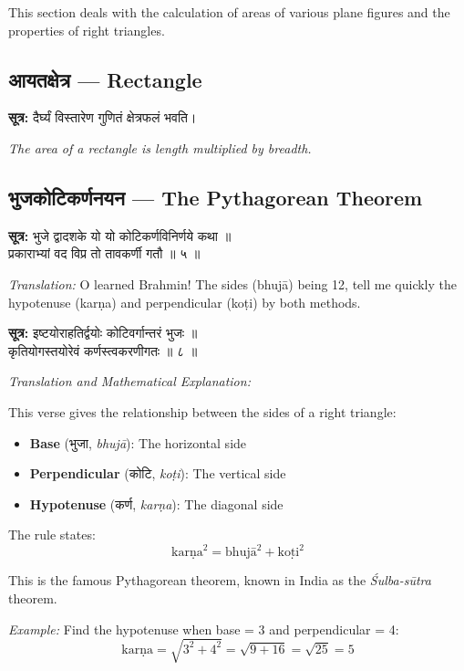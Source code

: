 \documentclass[10pt,a4paper]{article}
\newenvironment{sanskritverse}{%
  \begin{center}%
  \begin{minipage}{0.94\textwidth}%
  \centering\devanagarifont\small%
}{%
  \end{minipage}%
  \end{center}%
  \vspace{0.1em}%
}
\newcommand{\sutratxt}[2]{%
  \begin{center}%
  \colorbox{sanskritbg}{%
    \begin{minipage}{0.93\textwidth}%
    \centering\small\vspace{3pt}%
    {\devanagarifont\textbf{सूत्र:} #1}\par\vspace{2pt}%
    \textit{#2}\vspace{3pt}%
    \end{minipage}%
  }%
  \end{center}%
  \vspace{0.1em}%
}
\begin{document}
This section deals with the calculation of areas of various plane figures and the properties of right triangles.

\subsection{आयतक्षेत्र — Rectangle}

\sutratxt{दैर्घ्यं विस्तारेण गुणितं क्षेत्रफलं भवति।}{The area of a rectangle is length multiplied by breadth.}

\subsection{भुजकोटिकर्णनयन — The Pythagorean Theorem}

\begin{sanskritverse}
\textbf{सूत्र:} भुजे द्वादशके यो यो कोटिकर्णविनिर्णये कथा ॥\\
प्रकाराभ्यां वद विप्र तो तावकर्णी गतौ ॥ ५ ॥
\end{sanskritverse}
\textit{Translation:} O learned Brahmin! The sides (bhujā) being 12, tell me quickly the hypotenuse (karṇa) and perpendicular (koṭi) by both methods.

\begin{sanskritverse}
\textbf{सूत्र:} इष्टयोराहतिर्द्वयोः कोटिवर्गान्तरं भुजः ॥\\
कृतियोगस्तयोरेवं कर्णस्त्वकरणीगतः ॥ ८ ॥
\end{sanskritverse}
\textit{Translation and Mathematical Explanation:}

This verse gives the relationship between the sides of a right triangle:
\begin{itemize}[itemsep=0pt]
\item \textbf{Base} (भुजा, \textit{bhujā}): The horizontal side
\item \textbf{Perpendicular} (कोटि, \textit{koṭi}): The vertical side
\item \textbf{Hypotenuse} (कर्ण, \textit{karṇa}): The diagonal side
\end{itemize}

The rule states:
\[
\text{karṇa}^2 = \text{bhujā}^2 + \text{koṭi}^2
\]

This is the famous Pythagorean theorem, known in India as the \textit{Śulba-sūtra} theorem.

\textit{Example:} Find the hypotenuse when base = 3 and perpendicular = 4:
\[
\text{karṇa} = \sqrt{3^2 + 4^2} = \sqrt{9 + 16} = \sqrt{25} = 5
\]
\end{document}
